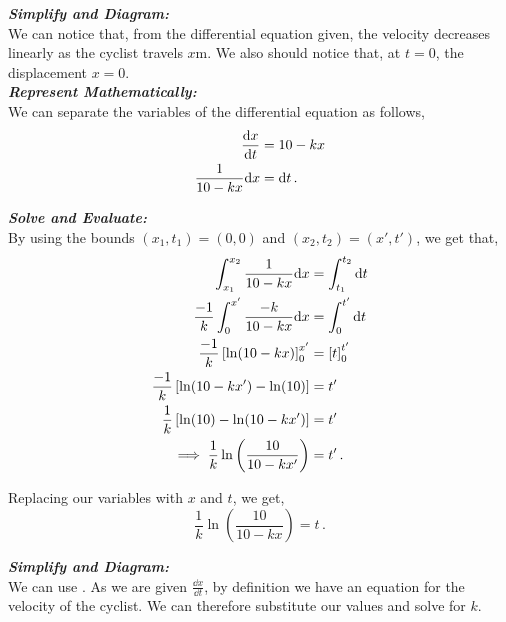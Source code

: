 \begin{subquestions}
\begin{subsubquestions}
	
	
\textbf{\textit{Simplify and Diagram:}} \\
We can notice that, from the differential equation given, the velocity decreases linearly as the cyclist travels $x$m. We also should notice that, at $t=0$, the displacement $x=0$.\\




\textbf{\textit{Represent Mathematically:}} \\
We can separate the variables of the differential equation as follows,
\begin{align}
	\frac{\mathrm{d}x}{\mathrm{d}t} & = 10-kx \nonumber \\
	\frac{1}{10-kx}\mathrm{d} x & = \mathrm{d} t \,.
\end{align}




\textbf{\textit{Solve and Evaluate:}} \\
By using the bounds $(x_1,t_1)=(0,0)$ and $(x_2,t_2)=(x',t')$, we get that,
\begin{align}
	\int_{x_1}^{x_2}\frac{1}{10-kx}\mathrm{d} x & = \int_{t_1}^{t_2}\mathrm{d} t \nonumber \\
	\frac{-1}{k} \int_{0}^{x'}\frac{-k}{10-kx}\mathrm{d} x & = \int_{0}^{t'}\mathrm{d} t \nonumber \\
	\frac{-1}{k} \left[\ln(10-kx)\right]_0^{x'} & = \left[t\right]_0^{t'} \nonumber \\
	\frac{-1}{k} \left[\ln(10-kx')-\ln(10)\right] & = t' \nonumber \\
	\frac{1}{k} \left[\ln(10)-\ln(10-kx')\right] & = t' \nonumber \\
	\implies \frac{1}{k} \ln\left(\frac{10}{10-kx'}\right) & = t' \,.
\end{align}

Replacing our variables with $x$ and $t$, we get,
\begin{equation}
	\frac{1}{k} \ln\left(\frac{10}{10-kx}\right) = t \,.
\end{equation}

\subsubquestion

\textbf{\textit{Simplify and Diagram:}} \\
We can use . As we are given $\frac{\dd x}{\dd t}$, by definition we have an equation for the velocity of the cyclist. We can therefore substitute our values and solve for $k$.\\





\end{subsubquestions}
\end{subquestions}
